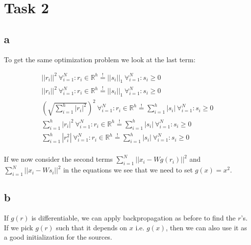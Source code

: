 \section*{Task 2}

\subsection*{a}

To get the same optimization problem we look at the last term:

\begin{gather*}
||r_i||^2 \ \forall^N_{i=1}: r_i\in\mathbb{R}^h \overset{!}{=} ||s_i||_1  \ \forall^N_{i=1}: s_i \geq 0\\
||r_i||^2 \ \forall^N_{i=1}: r_i\in\mathbb{R}^h \overset{!}{=} ||s_i||_1  \ \forall^N_{i=1}: s_i \geq 0\\
\left( \sqrt{\sum^h_{i=1} |r_i|^2} \right)^2 \ \forall^N_{i=1}: r_i\in\mathbb{R}^h \overset{!}{=} \sum^h_{i=1} |s_i| \ \forall^N_{i=1}: s_i \geq 0\\
\sum^h_{i=1} |r_i|^2 \ \forall^N_{i=1}: r_i\in\mathbb{R}^h \overset{!}{=} \sum^h_{i=1} |s_i| \ \forall^N_{i=1}: s_i \geq 0\\
\sum^h_{i=1} |r_i^2| \ \forall^N_{i=1}: r_i\in\mathbb{R}^h \overset{!}{=} \sum^h_{i=1} |s_i| \ \forall^N_{i=1}: s_i \geq 0\\
\end{gather*}

If we now consider the second terms $\sum^N_{i=1} ||x_i - W g(r_i)||^2$ and $\sum^N_{i=1} ||x_i - W s_i||^2 $ in the equations we see that we need to set $g(x) = x^2$.

\subsection*{b}

If $g(r)$ is differentiable, we can apply backpropagation as before to find the
$r$'s. If we pick $g(r)$ such that it depends on $x$ i.e. $g(x)$, then  we can also use it as
a good initialization for the sources.
